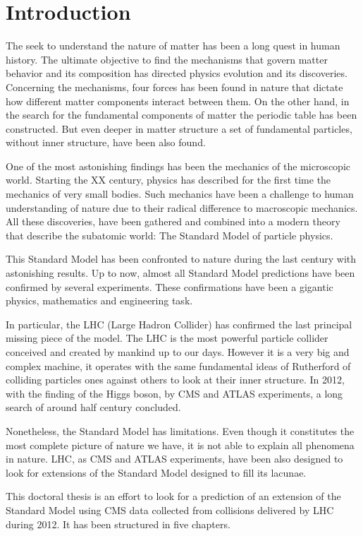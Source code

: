 \chapter*{Introduction}

The seek to understand the nature of matter has been a long quest in human history. The ultimate objective to find the mechanisms that govern matter behavior and its composition has directed physics evolution and its discoveries. Concerning the mechanisms, four forces has been found in nature that dictate how different matter components interact between them. On the other hand, in the search for the fundamental components of matter the periodic table has been constructed. But even deeper in matter structure a set of fundamental particles, without inner structure, have been also found. 

One of the most astonishing findings has been the mechanics of the microscopic world. Starting the XX century, physics has described for the first time the mechanics of very small bodies. Such mechanics have been a challenge to human understanding of nature due to their radical difference to macroscopic mechanics. All these discoveries, have been gathered and combined into a modern theory that describe the subatomic world: The Standard Model of particle physics. 

This Standard Model has been confronted to nature during the last century with astonishing results. Up to now, almost all Standard Model predictions have been confirmed by several experiments. These confirmations have been a gigantic physics, mathematics and engineering task.

In particular, the LHC (Large Hadron Collider) has confirmed the last principal missing piece of the model. The LHC is the most powerful particle collider conceived and created by mankind up to our days. However it is a very big and complex machine, it operates with the same fundamental ideas of Rutherford of colliding particles ones against others to look at their inner structure. In 2012, with the finding of the Higgs boson, by CMS and ATLAS experiments, a long search of around half century concluded.

Nonetheless, the Standard Model has limitations. Even though it constitutes the most complete picture of nature we have, it is not able to explain all phenomena in nature. LHC, as CMS and ATLAS experiments, have been also designed to look for extensions of the Standard Model designed to fill its lacunae. 

This doctoral thesis is an effort to look for a prediction of an extension of the Standard Model using CMS data collected from collisions delivered by LHC during 2012. It has been structured in five chapters.

